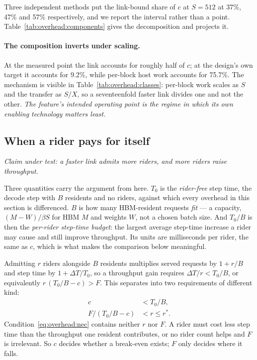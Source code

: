 Three independent methods put the link-bound share of $c$ at $S{=}512$ at 37\%,
47\% and 57\% respectively, and we report the interval rather than a point.
Table~\ref{tab:overhead:components} gives the decomposition and projects it.

\paragraph{The composition inverts under scaling.} At the measured point the
link accounts for roughly half of $c$; at the design's own target it accounts
for 9.2\%, while per-block host work accounts for 75.7\%. The mechanism is
visible in Table~\ref{tab:overhead:classes}: per-block work scales as $S$ and
the transfer as $S/X$, so a seventeenfold faster link divides one and not the
other. \emph{The feature's intended operating point is the regime in which its
own enabling technology matters least.}

\subsection{When a rider pays for itself}
\label{sec:overhead:pays}

\emph{Claim under test: a faster link admits more riders, and more riders raise
throughput.}

Three quantities carry the argument from here. $T_0$ is the \emph{rider-free}
step time, the decode step with $B$ residents and no riders, against which every
overhead in this section is differenced. $B$ is how many HBM-resident requests
\emph{fit} --- a capacity, $(M - W)/\beta S$ for HBM $M$ and weights $W$, not a
chosen batch size. And $T_0/B$ is then the \emph{per-rider step-time budget}: the
largest average step-time increase a rider may cause and still improve
throughput. Its units are milliseconds per rider, the same as $c$, which is what
makes the comparison below meaningful.

Admitting $r$ riders alongside $B$ residents multiplies served requests by
$1 + r/B$ and step time by $1 + \Delta T/T_0$, so a throughput gain requires
$\Delta T / r < T_0/B$, or equivalently $r\,(T_0/B - c) > F$. This separates into
two requirements of different kind:
\begin{align}
c &< T_0/B, \label{eq:overhead:nec}\\
F/(T_0/B - c) &< r \le r^{*}. \label{eq:overhead:reach}
\end{align}
Condition~\ref{eq:overhead:nec} contains neither $r$ nor $F$. A rider must cost
less step time than the throughput one resident contributes, or no rider count
helps and $F$ is irrelevant. So $c$ decides whether a break-even exists;
$F$ only decides where it falls.

